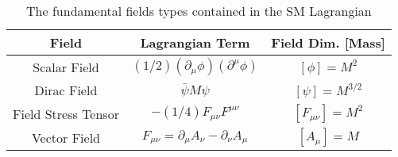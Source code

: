 \begin{center}
\begin{table}[]
\begin{center}
\caption{The fundamental fields types contained in the SM Lagrangian \cite{tully}}
\begin{tabular}{ccc}
Field & Lagrangian Term & Field Dim. [Mass]\\
\hline
Scalar Field & $(1/2)(\partial_\mu \phi)(\partial^\mu \phi)$ & $[\phi]=M^2$\\
Dirac Field & $\bar \psi M \psi$  & $[\psi]=M^{3/2}$\\
Field Stress Tensor &$-(1/4)F_{\mu\nu}F^{\mu\nu}$ & $[F_{\mu\nu}]=M^2$ \\
Vector Field & $F_{\mu\nu} = \partial_\mu A_\nu - \partial_\nu A_\mu$ & $[A_\mu]=M$\\
\end{tabular}
\label{tab:fields}
\end{center}
\end{table}
\end{center}
